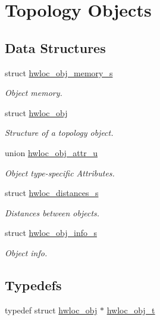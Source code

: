 \hypertarget{a00042}{
\section{Topology Objects}
\label{a00042}
}
\subsection*{Data Structures}
\begin{DoxyCompactItemize}
\item 
struct \hyperlink{a00020}{hwloc\_\-obj\_\-memory\_\-s}
\begin{DoxyCompactList}\small\item\em Object memory. \item\end{DoxyCompactList}\item 
struct \hyperlink{a00016}{hwloc\_\-obj}
\begin{DoxyCompactList}\small\item\em Structure of a topology object. \item\end{DoxyCompactList}\item 
union \hyperlink{a00017}{hwloc\_\-obj\_\-attr\_\-u}
\begin{DoxyCompactList}\small\item\em Object type-\/specific Attributes. \item\end{DoxyCompactList}\item 
struct \hyperlink{a00014}{hwloc\_\-distances\_\-s}
\begin{DoxyCompactList}\small\item\em Distances between objects. \item\end{DoxyCompactList}\item 
struct \hyperlink{a00018}{hwloc\_\-obj\_\-info\_\-s}
\begin{DoxyCompactList}\small\item\em Object info. \item\end{DoxyCompactList}\end{DoxyCompactItemize}
\subsection*{Typedefs}
\begin{DoxyCompactItemize}
\item 
typedef struct \hyperlink{a00016}{hwloc\_\-obj} $\ast$ \hyperlink{a00042_ga79b8ab56877ef99ac59b833203391c7d}{hwloc\_\-obj\_\-t}
\end{DoxyCompactItemize}


